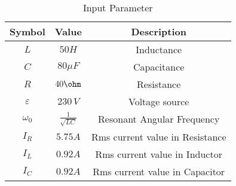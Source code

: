 \begin{table}[!ht]
\renewcommand\thetable{1}
   \centering
\begin{tabular}{|c|c|c|}
  \hline
  \textbf{Symbol} & \textbf{Value} & \textbf{Description}\\
  \hline
  $L$ &  $50H$ & Inductance\\
  \hline 
  $C$ &  $80 \mu F$ & Capacitance\\
  \hline
  $R$ &  $40\ohm$ & Resistance\\
  \hline
  $\varepsilon$ & $230\, V$ & Voltage source\\
  \hline
   $\omega_0$ & $\frac{1}{\sqrt{LC}}$ & Resonant Angular Frequency\\
  \hline
    $I_R$ &  $5.75A$ & Rms current value in Resistance\\
  \hline
   $I_L$ &  $0.92A$ & Rms current value in Inductor\\
  \hline
    $I_C$ &  $0.92A$ & Rms current value in Capacitor\\
  \hline
\end{tabular}
\caption{Input Parameter}
\end{table}
